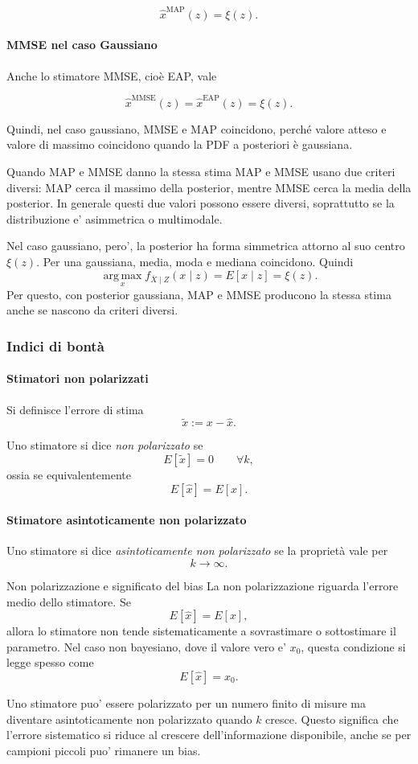\documentclass[11pt,a4paper]{article}
\begin{document}
\[
\hat x^{\mathrm{MAP}}(z)=\xi(z).
\]

\paragraph{MMSE nel caso Gaussiano}
Anche lo stimatore MMSE, cioè EAP, vale

\[
\hat x^{\mathrm{MMSE}}(z)=\hat x^{\mathrm{EAP}}(z)=\xi(z).
\]

Quindi, nel caso gaussiano, MMSE e MAP coincidono,
perché valore atteso e valore di massimo coincidono
quando la PDF a posteriori è gaussiana.

\begin{spiegazione}{Quando MAP e MMSE danno la stessa stima}
MAP e MMSE usano due criteri diversi: MAP cerca il massimo della posterior, mentre MMSE cerca la media della posterior. In generale questi due valori possono essere diversi, soprattutto se la distribuzione e' asimmetrica o multimodale.

Nel caso gaussiano, pero', la posterior ha forma simmetrica attorno al suo centro $\xi(z)$. Per una gaussiana, media, moda e mediana coincidono. Quindi
\[
\operatorname*{arg\,max}_x f_{\bar X\mid Z}(x\mid z)
=
E[x\mid z]
=
\xi(z).
\]
Per questo, con posterior gaussiana, MAP e MMSE producono la stessa stima anche se nascono da criteri diversi.
\end{spiegazione}


\subsubsection*{Indici di bontà}

\paragraph{Stimatori non polarizzati}
Si definisce l'errore di stima
\[
\tilde x :=x -\hat x.
\]

Uno stimatore si dice \emph{non polarizzato} se
\[
E[\tilde x]=0
\qquad \forall k,
\]
ossia se equivalentemente
\[
E[\hat x]=E[x].
\]

\paragraph{Stimatore asintoticamente non polarizzato}
Uno stimatore si dice \emph{asintoticamente non polarizzato} se la proprietà vale per
\[
k\to\infty.
\]

\begin{spiegazione}{Non polarizzazione e significato del bias}
La non polarizzazione riguarda l'errore medio dello stimatore. Se
\[
E[\hat x]=E[x],
\]
allora lo stimatore non tende sistematicamente a sovrastimare o sottostimare il parametro. Nel caso non bayesiano, dove il valore vero e' $x_0$, questa condizione si legge spesso come
\[
E[\hat x]=x_0.
\]

Uno stimatore puo' essere polarizzato per un numero finito di misure ma diventare asintoticamente non polarizzato quando $k$ cresce. Questo significa che l'errore sistematico si riduce al crescere dell'informazione disponibile, anche se per campioni piccoli puo' rimanere un bias.
\end{spiegazione}
\end{document}
